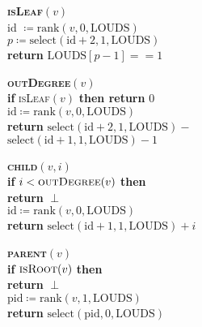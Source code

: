 \begin{minipage}{.475\textwidth}
  \begin{pseudocode}
    \textbf{\textsc{isLeaf}}\( (v) \) \\
    id \( \coloneqq \text{rank}(v, 0, \text{LOUDS}) \) \\
    \( p \coloneqq \text{select}(\text{id} + 2, 1, \text{LOUDS}) \) \\
    \textbf{return} \( \text{LOUDS}[p-1] == 1 \) \\
  \end{pseudocode}
\end{minipage}
\hfill
\begin{minipage}{.475\textwidth}
  \begin{pseudocode}
    \textbf{\textsc{outDegree}}\( (v) \) \\
    \textbf{if} \textsc{isLeaf}\( (v) \) \textbf{then return} \( 0 \) \\
    \( \text{id} \coloneqq \text{rank}(v,0,\text{LOUDS}) \) \\
    \textbf{return} \( \text{select}(\text{id}+2,1,\text{LOUDS}) - \) \\  \( \text{select}(\text{id} + 1, 1, \text{LOUDS}) - 1 \)
  \end{pseudocode}
\end{minipage}

\begin{minipage}{.475\textwidth}
  \begin{pseudocode}
    \textbf{\textsc{child}}\( (v,i) \) \\
    \textbf{if} \( i < \textsc{outDegree}(v) \) \textbf{then} \\ \phantom{\enskip} \textbf{return} \( \perp \) \\
    \( \text{id} \coloneqq \text{rank}(v,0,\text{LOUDS}) \) \\
    \textbf{return} \( \text{select}(\text{id} + 1, 1, \text{LOUDS}) + i \)
  \end{pseudocode}
\end{minipage}
\hfill
\begin{minipage}{.475\textwidth}
  \begin{pseudocode}
    \textbf{\textsc{parent}}\( (v) \) \\
    \textbf{if} \( \textsc{isRoot}(v) \) \textbf{then} \\ \phantom{\enskip} \textbf{return} \( \perp \) \\
    \( \text{pid} \coloneqq \text{rank}(v,1,\text{LOUDS}) \) \\
    \textbf{return} \( \text{select}(\text{pid},0,\text{LOUDS}) \)
  \end{pseudocode}
\end{minipage}